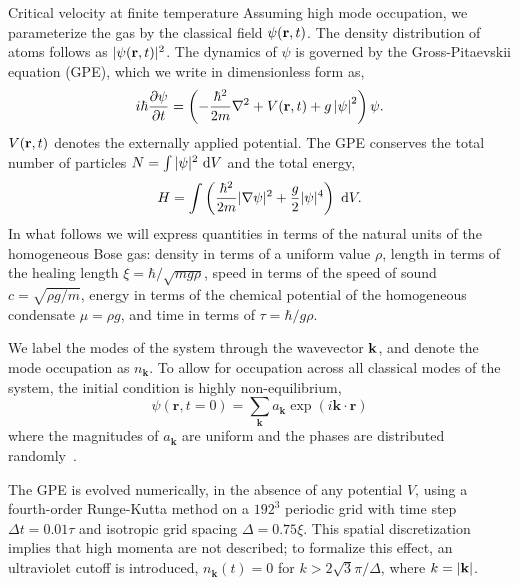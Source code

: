 \begin{chapter}{\label{cha:nonequib}Critical velocity at finite temperature}
Assuming high mode occupation, we parameterize the gas by the classical field $\psi({\bf r},t)$.  The density distribution of atoms follows as $|\psi({\bf r},t)|^2$.  %
The dynamics of $\psi$ is governed by the Gross-Pitaevskii equation (GPE), which we write in dimensionless form as,
  \begin{eqnarray}
i  \hbar \frac{\partial\psi }{\partial t}=\left( -\frac{\hbar^2}{2m}\nabla^{2} + V({\bf r},t) +g\left|\psi \right|^{2} \right ) \psi.\label{gpe}
  \end{eqnarray}
$V({\bf r},t)$ denotes the externally applied potential.  The GPE conserves the total number of particles $N = \int |\psi|^2~{\rm d}V$ and the total energy,
\[H=\int \left(\frac{\hbar^2}{2m}|\nabla \psi|^2 + \frac{g}{2}|\psi|^4 \right)~{\rm d}V.\]  
In what follows we will express quantities in terms of the natural units of the homogeneous Bose gas:  density in terms of a uniform value $\rho$, length in terms of the healing length $\xi=\hbar/\sqrt{m g \rho}$, speed in terms of the speed of sound $c=\sqrt{\rho g/m}$, energy in terms of the chemical potential of the homogeneous condensate $\mu=\rho g$, and time in terms of $\tau=\hbar / g \rho$.   
  

We label the modes of the system through the wavevector ${\bf k}$, and denote the mode occupation as $n_{\mathbf{k}}$.  To allow for occupation across all classical modes of the system, the initial condition is highly non-equilibrium, 
  \begin{equation}
    \psi \left(\mathbf{r},t=0\right)=\sum_{\mathbf{k}}a_{\mathbf k}\exp(i\mathbf{k}\cdot\mathbf{r})
    \label{eq:rand2}
  \end{equation}
where the magnitudes of $a_{\mathbf k}$ are uniform and the phases are distributed randomly~\cite{PhysRevA.66.013603}.   

The GPE is evolved numerically, in the absence of any potential $V$, using a fourth-order Runge-Kutta method on a $192^3$ periodic grid with time step $\Delta t =0.01 \tau$ and isotropic grid spacing $\Delta =0.75\xi$. This spatial discretization implies that high momenta are not described; to formalize this effect, an ultraviolet cutoff is introduced, $n_{\mathbf{k}}(t)=0$ for $k> 2\sqrt{3} \pi / \Delta$, where $k=|{\bf k}|$.   




\end{chapter}
